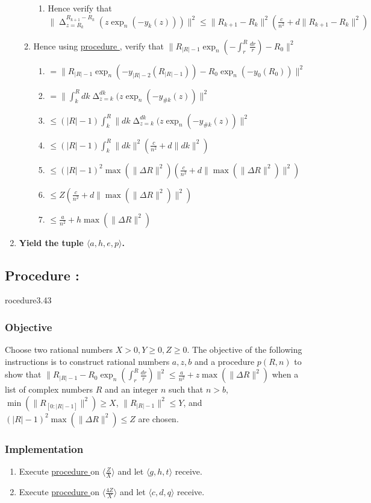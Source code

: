 \documentclass{article}
\DeclareMathOperator*{\diff}{\Delta}
\newcounter{procedure}[part]
\newcommand{\procedure}[1]{\subsection*{Procedure \thepart:\theprocedure}\label{sec:procedure #1}\global\expandafter\edef\csname procedure#1\endcsname{\thepart:\theprocedure}\addtocounter{procedure}{1}}
\newcommand{\objective}{\subsubsection*{Objective}}
\newcommand{\implementation}{\subsubsection*{Implementation}}
\newcommand{\procedurehr}[1]{\hyperref[sec:procedure #1]{procedure \expandafter\csname procedure#1\endcsname}}
\begin{document}
\begin{multicols}{2}
\begin{enumerate}
\begin{enumerate}
\begin{enumerate}
							\item Hence verify that $\lVert\diff_{z=R_{k}}^{R_{k+1}-R_{k}}(z\exp_n(-y_k(z)))\rVert^2\le\lVert R_{k+1}-R_{k}\rVert^2(\frac{c}{n^2}+d\lVert R_{k+1}-R_{k}\rVert^2)$
						\end{enumerate}
						\item Hence using \procedurehr{3.34}, verify that $\lVert R_{\lvert R\rvert-1}\exp_n(-\int_r^R\frac{dr}{r})-R_0\rVert^2$
						\begin{enumerate}
							\item $=\lVert R_{\lvert R\rvert-1}\exp_n(-y_{\lvert R\rvert-2}(R_{\lvert R\rvert-1}))-R_0\exp_n(-y_0(R_0))\rVert^2$
							\item $=\lVert\int_{k}^{R}dk\diff_{z=k}^{dk}(z\exp_n(-y_{\#k}(z))\rVert^2$
							\item $\le(\lvert R\rvert-1)\int_{k}^{R}\lVert dk\diff_{z=k}^{dk}(z\exp_n(-y_{\#k}(z))\rVert^2$
							\item $\le(\lvert R\rvert-1)\int_{k}^{R}\lVert dk\rVert^2(\frac{c}{n^2}+d\lVert dk\rVert^2)$
							\item $\le(\lvert R\rvert-1)^2\max(\lVert\Delta R\rVert^2)(\frac{c}{n^2}+d\lVert\max(\lVert\Delta R\rVert^2)\rVert^2)$
							\item $\le Z(\frac{c}{n^2}+d\lVert\max(\lVert\Delta R\rVert^2)\rVert^2)$
							\item $\le\frac{a}{n^2}+h\max(\lVert\Delta R\rVert^2)$
						\end{enumerate}
					\end{enumerate}
					\item \textbf{Yield the tuple $\langle a,h,e,p\rangle$.}
				\end{enumerate}
		\procedure{3.43}
			\objective
				Choose two rational numbers $X>0,Y\ge 0,Z\ge 0$. The objective of the following instructions is to construct rational numbers $a,z,b$ and a procedure $p(R,n)$ to show that $\lVert R_{\lvert R\rvert-1}-R_0\exp_n(\int_r^R\frac{dr}{r})\rVert^2\le\frac{a}{n^2}+z\max(\lVert\Delta R\rVert^2)$ when a list of complex numbers $R$ and an integer $n$ such that $n>b$, $\min(\lVert R_{[0:\lvert R\rvert-1]}\rVert^2)\ge X$, $\lVert R_{\lvert R\rvert-1}\rVert^2\le Y$, and $(\lvert R\rvert-1)^2\max(\lVert\Delta R\rVert^2)\le Z$ are chosen.
			\implementation
				\begin{enumerate}
					\item Execute \procedurehr{3.13} on $\langle\frac{Z}{X}\rangle$ and let $\langle g,h,t\rangle$ receive.
					\item Execute \procedurehr{3.15} on $\langle\frac{4Z}{X}\rangle$ and let $\langle c,d,q\rangle$ receive.

\end{enumerate}
\end{multicols}
\end{document}
